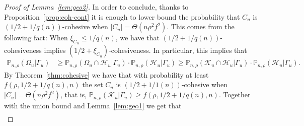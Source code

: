 \documentclass[letterpaper,11pt]{article}
\newcommand{\PP}{\mathbb{P}}
\newcommand{\calH}{\mathcal{H}}
\begin{document}
\begin{proof}[Proof of Lemma~\ref{lem:geo2}]
In order to conclude, thanks to Proposition~\ref{prop:coh-cont} it is enough to lower bound the probability that $C_u$ is $(1/2+1/q(n))$-cohesive when $|C_u|=\Theta(n\rho^2f^2)$.
This comes from the following fact: When $\xi_{C_u}\le 1/q(n)$, we have that $(1/2+1/q(n))$-cohesiveness implies $(1/2+\xi_{C_u})$-cohesiveness.
In particular, this implies that 
\begin{align*}
\PP_{n,\rho}(\Omega_u|\Gamma_u)&\ge \PP_{n,\rho}(\Omega_u\cap \calH_u|\Gamma_u)\cdot \PP_{n,\rho}(\calH_u|\Gamma_u)\ge \PP_{n,\rho}(\mathcal{K}_u\cap \calH_u|\Gamma_u)\cdot \PP_{n,\rho}(\calH_u|\Gamma_u).
\end{align*}
By Theorem~\ref{thm:cohesive} we have that with probability at least $f(\rho,1/2+1/q(n),n)$ the set $C_u$ is $(1/2+1/1(n))$-cohesive when $|C_u|=\Theta(n\rho^2f^2)$, that is, $\PP_{n,\rho}(\mathcal{K}_u|\Gamma_u)\ge f(\rho,1/2+1/q(n),n)$.
Together with the union bound and Lemma~\ref{lem:geo1} we get that
\begin{align*}

\end{align*}
\end{proof}
\end{document}
